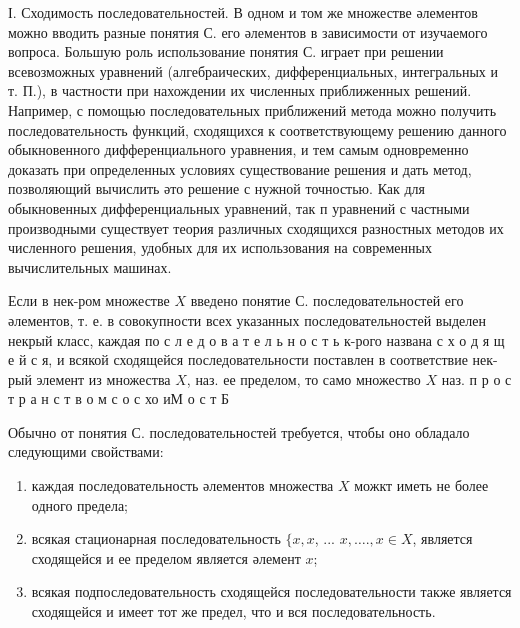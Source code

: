 \documentclass[10pt]{article}
\begin{document}
І. Сходимость последовательностей. В одном и том же множестве әлементов можно вводить разные понятия С. его әлементов в зависимости от изучаемого вопроса. Большую роль использование понятия С. играет при решении всевозможных уравнений (алгебраических, дифференциальных, интегральных и т. П.), в частности при нахождении их численных приближенных решений. Например, с помощью последовательных приближений метода можно получить последовательность функций, сходящихся к соответствующему решению данного обыкновенного дифференциального уравнения, и тем самым одновременно доказать при определенных условиях существование решения и дать метод, позволяющий вычислить әто решение с нужной точностью. Как для обыкновенных дифференциальных уравнений, так п уравнений с частными производными существует теория различных сходящихся разностных методов их численного решения, удобных для их использования на современных вычислительных машинах.



Если в нек-ром множестве $X$ введено понятие С. последовательностей его әлементов, т. е. в совокупности всех указанных последовательностей выделен некрый класс, каждая по с л е д о в а т е л ь н о с т ь к-рого названа с х о д я щ е й с я, и всякой сходящейся последовательности поставлен в соответствие нек-рый элемент из множества $X$, наз. ее пределом, то само множество $X$ наз. п р о с т р а н с т в о м с о с хо иМ о с т Б



Обычно от понятия С. последовательностей требуется, чтобы оно обладало следующими свойствами:



\begin{enumerate}

  \item каждая последовательность әлементов множества $X$ можкт иметь не более одного предела;



  \item всякая стационарная последовательность $\{x, x$, ... $x, \ldots ., x \in X$, является сходящейся и ее пределом является әлемент $x$;



  \item всякая подпоследовательность сходящейся последовательности также является сходящейся и имеет тот же предел, что и вся последовательность.



\end{enumerate}
\end{document}
